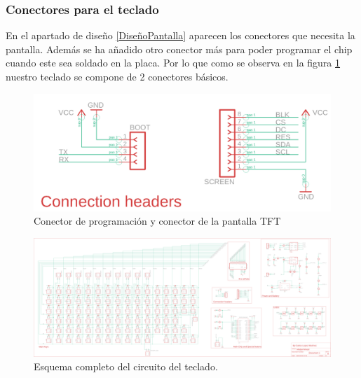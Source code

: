\subsubsection{Conectores para el teclado}
En el apartado de diseño \ref{DiseñoPantalla} aparecen los conectores que necesita la pantalla. Además se ha añadido otro conector más para poder programar el chip cuando este sea soldado en la placa. Por lo que como se observa en la figura \ref{fig:CircuitoConectores} nuestro teclado se compone de 2 conectores básicos.

\begin{figure}[H]
    \centering
    \includegraphics[width=1.0\textwidth]{imagenes/Capitulos/Cap04/Conectores.png}
    \caption{Conector de programación y conector de la pantalla \gls{TFT} \cite{Repo:ImagenCircuito}}
    \label{fig:CircuitoConectores}
\end{figure}

\begin{figure}
\centering
\includegraphics[width=\textheight]{imagenes/Capitulos/Cap04/Esquematico.png}
\caption{Esquema completo del circuito del teclado. \cite{Repo:ImagenCircuito}}
\label{fig:CircuitoCompleto}
\end{figure}